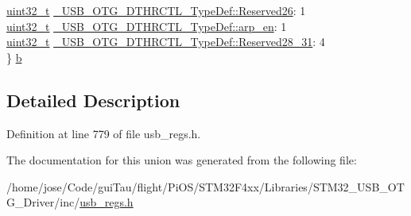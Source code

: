 \begin{DoxyCompactItemize}
\begin{tabbing}
\>\hyperlink{stdint_8h_a435d1572bf3f880d55459d9805097f62}{uint32\_t} \hyperlink{group___u_s_b___o_t_g___d_r_i_v_e_r_ga632ec9c8d1277a82227409d456d3f545}{\_USB\_OTG\_DTHRCTL\_TypeDef::Reserved26}: 1\\
\>\hyperlink{stdint_8h_a435d1572bf3f880d55459d9805097f62}{uint32\_t} \hyperlink{group___u_s_b___o_t_g___d_r_i_v_e_r_gabb5b2edd6a3c01d382137065e1277feb}{\_USB\_OTG\_DTHRCTL\_TypeDef::arp\_en}: 1\\
\>\hyperlink{stdint_8h_a435d1572bf3f880d55459d9805097f62}{uint32\_t} \hyperlink{group___u_s_b___o_t_g___d_r_i_v_e_r_ga11a3281d786b50e552ccfc47d7de12b5}{\_USB\_OTG\_DTHRCTL\_TypeDef::Reserved28\_31}: 4\\
\} \hyperlink{group___u_s_b___o_t_g___d_r_i_v_e_r_ga47a9e165b9c7e488abd30978d4a8e0cb}{b}\\

\end{tabbing}\end{DoxyCompactItemize}


\subsection{Detailed Description}


Definition at line 779 of file usb\-\_\-regs.\-h.



The documentation for this union was generated from the following file\-:\begin{DoxyCompactItemize}
\item 
/home/jose/\-Code/gui\-Tau/flight/\-Pi\-O\-S/\-S\-T\-M32\-F4xx/\-Libraries/\-S\-T\-M32\-\_\-\-U\-S\-B\-\_\-\-O\-T\-G\-\_\-\-Driver/inc/\hyperlink{_s_t_m32_f4xx_2_libraries_2_s_t_m32___u_s_b___o_t_g___driver_2inc_2usb__regs_8h}{usb\-\_\-regs.\-h}\end{DoxyCompactItemize}
